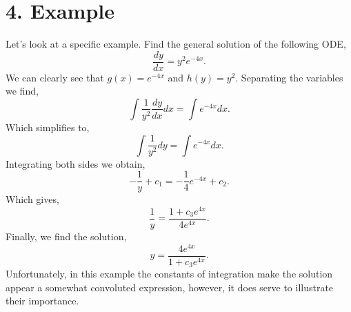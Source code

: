 \documentclass[11pt]{article}
\begin{document}
\newpage

\section*{4. Example}
Let's look at a specific example. Find the general solution of the following ODE,
\begin{equation}
    \frac{dy}{dx} = y^2 e^{-4x}.
\end{equation}
We can clearly see that $g(x) = e^{-4x}$ and $h(y) = y^2$. Separating the variables we find,
\begin{equation}
    \int \frac{1}{y^2} \frac{dy}{dx} dx = \int e^{-4x} dx.
\end{equation}
Which simplifies to,
\begin{equation}
    \int \frac{1}{y^2} dy = \int e^{-4x} dx.
\end{equation}
Integrating both sides we obtain,
\begin{equation}
    -\frac{1}{y} + c_1 = -\frac{1}{4 }e^{-4x} + c_2.
\end{equation}
Which gives, 
\begin{equation}
    \frac{1}{y} = \frac{1 + c_3 e^{4x}}{4e^{4x}}.
\end{equation}
Finally, we find the solution,
\begin{equation}
   y = \frac{4e^{4x}}{1 + c_3 e^{4x}}.
\end{equation}
Unfortunately, in this example the constants of integration make the solution appear a somewhat convoluted expression, however, it does serve to illustrate their importance. 
\end{document}
